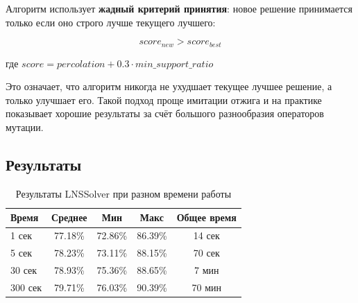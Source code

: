 Алгоритм использует \textbf{жадный критерий принятия}: новое решение принимается только если оно строго лучше текущего лучшего:

$$score_{new} > score_{best}$$

где $score = percolation + 0.3 \cdot min\_support\_ratio$

Это означает, что алгоритм никогда не ухудшает текущее лучшее решение, а только улучшает его. Такой подход проще имитации отжига и на практике показывает хорошие результаты за счёт большого разнообразия операторов мутации.

\subsection{Результаты}

\begin{table}[ht]
\centering
\caption{Результаты LNSSolver при разном времени работы}
\begin{tabular}{|l|c|c|c|c|}
\hline
\textbf{Время} & \textbf{Среднее} & \textbf{Мин} & \textbf{Макс} & \textbf{Общее время} \\
\hline
1 сек & 77.18\% & 72.86\% & 86.39\% & 14 сек \\
5 сек & 78.23\% & 73.11\% & 88.15\% & 70 сек \\
30 сек & 78.93\% & 75.36\% & 88.65\% & 7 мин \\
300 сек & 79.71\% & 76.03\% & 90.39\% & 70 мин \\
\hline
\end{tabular}
\end{table}

